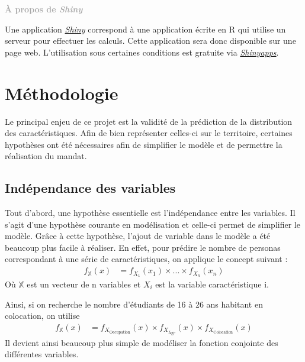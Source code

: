 \documentclass[11pt,french]{article}\usepackage[]{graphicx}\usepackage[]{color}
\newenvironment{moreInfo}[1]
	{\begin{mdframed}
	\textcolor{darkgray}{\huge \raisebox{-3.5pt}{\faInfo} 
	\hspace{0.5cm} \large\bfseries #1}\\[5pt]
	\normalsize
	\makebox[0.1\textwidth][l]{}	
	\begin{minipage}{10cm}}
	{	\end{minipage}
	\end{mdframed}}
\begin{document}
\begin{moreInfo}{\color{Gray}À propos de \emph{Shiny}
     \color{black}}
     Une application \href{https://shiny.rstudio.com}{\emph{Shiny}} correspond à une application écrite en R qui utilise un serveur pour effectuer les calculs. Cette application sera donc disponible sur une page web. L'utilisation sous certaines conditions est gratuite via  \href{https://www.shinyapps.io}{\emph{Shinyapps}}.
\end{moreInfo}

\section{Méthodologie}

Le principal enjeu de ce projet est la validité de la prédiction de la distribution des caractéristiques. Afin de bien représenter celles-ci sur le territoire, certaines hypothèses ont été nécessaires afin de simplifier le modèle et de permettre la réalisation du mandat.
\newline

\subsection*{Indépendance des variables}

Tout d'abord, une hypothèse essentielle est l'indépendance entre les variables. Il s'agit d'une hypothèse courante en modélisation et celle-ci permet de simplifier le modèle. Grâce à cette hypothèse, l'ajout de variable dans le modèle a été beaucoup plus facile à réaliser. En effet, pour prédire le nombre de personas correspondant à une série de caractéristiques, on applique le concept suivant :
\begin{align*}
f_{\mathbb{X}}(x) &= f_{X_1}(x_1) \times ... \times f_{X_n}(x_n)
\end{align*}
Où $\mathbb{X}$ est un vecteur de n variables et $X_i$ est la variable caractéristique i.
\newline

Ainsi, si on recherche le nombre d'étudiants de 16 à 26 ans habitant en colocation, on utilise 
\begin{align*}
f_{\mathbb{X}}(x) &= f_{X_{\text{Occupation}}}(x) \times f_{X_{\text{Âge}}}(x) \times f_{X_{\text{Colocation}}}(x)
\end{align*}
Il devient ainsi beaucoup plus simple de modéliser la fonction conjointe des différentes variables. 
\newline
\end{document}
